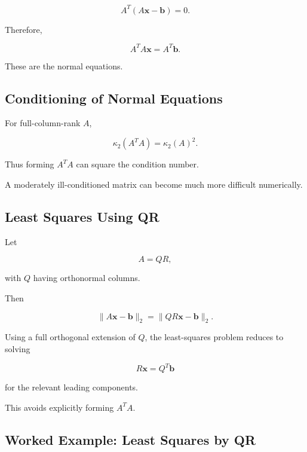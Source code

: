 \[
\boxed{
A^T
(
A\mathbf{x}-\mathbf{b}
)
=
0.
}
\]

Therefore,

\[
\boxed{
A^TA\mathbf{x}
=
A^T\mathbf{b}.
}
\]

These are the normal equations.

\subsection{Conditioning of Normal Equations}
\label{subsec:normal-equations-conditioning}

For full-column-rank \(A\),

\[
\boxed{
\kappa_2(A^TA)
=
\kappa_2(A)^2.
}
\]

Thus forming \(A^TA\) can square the condition number.

A moderately ill-conditioned matrix can become much more difficult
numerically.

\subsection{Least Squares Using QR}
\label{subsec:least-squares-qr}

Let

\[
A=QR,
\]

with \(Q\) having orthonormal columns.

Then

\[
\|A\mathbf{x}-\mathbf{b}\|_2
=
\|QR\mathbf{x}-\mathbf{b}\|_2.
\]

Using a full orthogonal extension of \(Q\), the least-squares problem
reduces to solving

\[
\boxed{
R\mathbf{x}
=
Q^T\mathbf{b}
}
\]

for the relevant leading components.

This avoids explicitly forming \(A^TA\).

\subsection{Worked Example: Least Squares by QR}
\label{subsec:worked-least-squares-qr}

